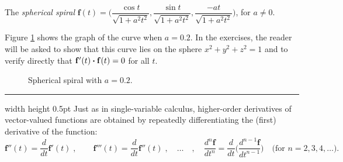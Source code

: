 \begin{exmp}\label{exmp:sphspiral}
 The \emph{spherical spiral}
 $\mathbf{f}(t) = \biggl( \dfrac{\cos t}{\sqrt{1 + a^2 t^2}},\dfrac{\sin t}{\sqrt{1 + a^2 t^2}},
  \dfrac{-at}{\sqrt{1 + a^2 t^2}} \biggr)$, for $a \ne 0$.\smallskip
  \par\noindent Figure \ref{fig:sphspiral} shows the graph of the curve when $a = 0.2$. In the exercises, the reader will be asked to
  show that this curve lies on the sphere $x^2 + y^2 + z^2 = 1$ and to verify directly that
  $\mathbf{f}'(t) \bm{\cdot} \mathbf{f}(t) = 0$ for all $t$.
 \begin{figure}[h]
  \begin{center}
   
  \end{center}
 \caption[]{\quad Spherical spiral with $a = 0.2$.}
 \label{fig:sphspiral}
 \end{figure}
\end{exmp}
\hrule width \textwidth height 0.5pt
\vskip3mm
Just as in single-variable calculus, higher-order derivatives of vector-valued functions are obtained by repeatedly
differentiating the (first) derivative of the function:
\begin{displaymath}
 \mathbf{f}''(t) = \dfrac{d}{dt} \mathbf{f}'(t) \; , \qquad \mathbf{f}'''(t) = \dfrac{d}{dt} \mathbf{f}''(t) \;
 , \quad \ldots \quad , \quad \dfrac{d^{n}\mathbf{f}}{dt^{n}} =
 \dfrac{d}{dt} \biggl( \dfrac{d^{n-1}\mathbf{f}}{dt^{n-1}} \biggr) \text{~~~(for $n = 2, 3, 4,\ldots$).}
\end{displaymath}


